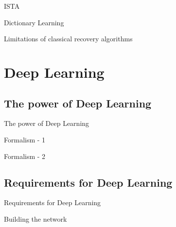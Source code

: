 \documentclass[aspectratio=169,xcolor=dvipsnames]{beamer}
\begin{document}
\begin{frame}{ISTA}

\end{frame}

\begin{frame}{Dictionary Learning}

\end{frame}


\begin{frame}{Limitations of classical recovery algorithms}
\end{frame}

\section{Deep Learning}

\subsection{The power of Deep Learning}
\begin{frame}{The power of Deep Learning}
\end{frame}

\begin{frame}{Formalism - 1}
\end{frame}

\begin{frame}{Formalism - 2}
\end{frame}

\subsection{Requirements for Deep Learning}
\begin{frame}{Requirements for Deep Learning}
\end{frame}

\begin{frame}{Building the network}
\end{frame}
\end{document}
